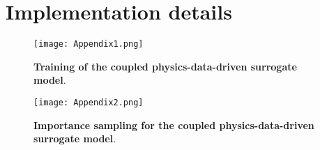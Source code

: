 \documentclass[number,preprint,3p]{elsarticle}
\newcommand{\1}[2]{\mathbb{I}_{#1}\left(#2\right)}
\begin{document}
	
	
	\appendix
	\section{Implementation details}\label{Append:implementationdetails}
	
	\begin{figure}[H]
		\centering
		\texttt{[image: Appendix1.png]}
		\caption{\textbf{Training of the coupled physics-data-driven surrogate model}.}
		\label{Fig:Appendix1}
	\end{figure}
	
	\begin{figure}[H]
		\centering
		\texttt{[image: Appendix2.png]}
		\caption{\textbf{Importance sampling for the coupled physics-data-driven surrogate model}.}
		\label{Fig:Appendix2}
	\end{figure}
	
\end{document}
